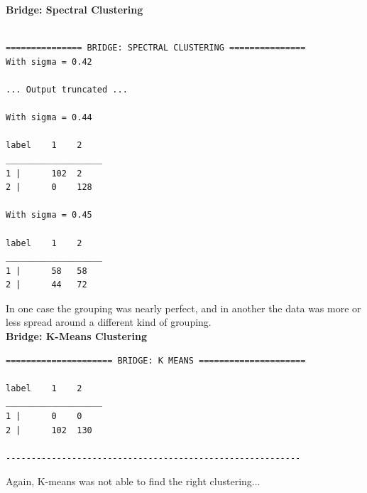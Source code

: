 \documentclass[11pt]{article}
\begin{document}
\textbf{Bridge: Spectral Clustering} 
\begin{verbatim}

=============== BRIDGE: SPECTRAL CLUSTERING ===============
With sigma = 0.42

... Output truncated ... 	

With sigma = 0.44

label    1    2    
___________________
1 |      102  2    
2 |      0    128    

With sigma = 0.45

label    1    2    
___________________
1 |      58   58    
2 |      44   72    

\end{verbatim}
In one case the grouping was nearly perfect, and in another the data was more or less spread around a different kind of grouping.
\\[5pt]
\textbf{Bridge: K-Means Clustering} 
\begin{verbatim}
===================== BRIDGE: K MEANS =====================

label    1    2    
___________________
1 |      0    0    
2 |      102  130    

----------------------------------------------------------
\end{verbatim}
Again, K-means was not able to find the right clustering... 
\\[5pt]
\end{document}
